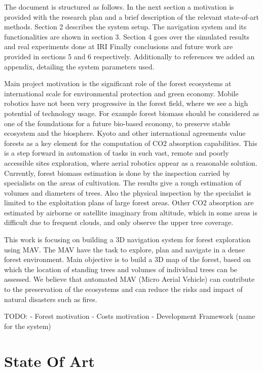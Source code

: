 \documentclass[runningheads]{llncs}
\begin{document}
The document is structured as follows. In the next section a motivation is provided with the research plan and a brief description of the relevant state-of-art methods. Section 2 describes the system setup. The navigation system and its functionalities are shown in section 3. Section 4 goes over the simulated results and real experiments done at IRI Finally conclusions and future work are provided in sections 5 and 6 respectively. Additionally to references we added an appendix, detailing the system parameters used.

Main project motivation is the significant role of the forest ecosystems at international scale for environmental protection and green economy. Mobile robotics have not been very progressive in the forest field, where we see a high potential of technology usage. For example forest biomass should be considered as one of the foundations for a future bio-based economy, to preserve stable ecosystem and the biosphere. Kyoto and other international agreements value forests as a key element for the computation of CO2 absorption capabilities. This is a step forward in automation of tasks in such vast, remote and poorly accessible sites exploration, where aerial robotics appear as a reasonable solution. Currently, forest biomass estimation is done by the inspection carried by specialists on the areas of cultivation. The results give a rough estimation of volumes and diameters of trees. Also the physical inspection by the specialist is limited to the exploitation plans of large forest areas. Other CO2 absorption are estimated by airborne or satellite imaginary from altitude, which in some areas is difficult due to frequent clouds, and only observe the upper tree coverage. 

This work is focusing on building a 3D navigation system for forest exploration using MAV. The MAV have the task to explore, plan and navigate in a dense forest environment. Main objective is to build a 3D map of the forest, based on which the location of standing trees and volumes of individual trees can be assessed. We believe that automated MAV (Micro Aerial Vehicle) can contribute to the preservation of the ecosystems and can reduce the risks and impact of natural disasters such as fires.

TODO: 
- Forest motivation
- Costs motivation
- Development Framework (name for the system)

\section{State Of Art}
\end{document}
